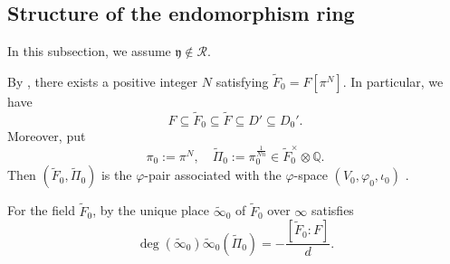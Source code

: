 \documentclass[10pt]{amsart}
\theoremstyle{plain}
\theoremstyle{definition}
\newcommand{\cR}{\mathcal{R}}
\newcommand{\bQ}{\mathbb{Q}}
\newcommand{\fry}{\mathfrak{y}}
\begin{document}
\subsection{Structure of the endomorphism ring}\label{SubsecStrEndRing}

In this subsection, we assume $\fry\notin\cR$.



By \cite[(A.4) and Corollary 9.10]{LRS},
there exists a positive integer $N$ satisfying $\tilde{F}_0=F[\pi^N]$.
In particular, we have
\begin{equation}\label{EqnEmbFtilde0D0Prime}
F\subseteq \tilde{F}_0\subseteq \tilde{F}\subseteq D'\subseteq D_0'.
\end{equation}
Moreover, put
\[
\pi_0:=\pi^N,\quad \tilde{\Pi}_0:=\pi_0^{\frac{1}{Nn}}\in \tilde{F}_0^\times\otimes \bQ. 
\]
Then $(\tilde{F}_0,\tilde{\Pi}_0)$ is the $\varphi$-pair associated with the $\varphi$-space $(V_0,\varphi_0,\iota_0)$
\cite[(A.4)]{LRS}.


For the field $\tilde{F}_0$, by \cite[Proposition 9.9 (ii)]{LRS} the unique place $\tilde{\infty}_0$ of $\tilde{F}_0$
over $\infty$ satisfies
\begin{equation}\label{EqnUniquePlaceInfty_LRS}
	\deg(\tilde{\infty}_0)\tilde{\infty}_0(\tilde{\Pi}_0)=-\frac{[\tilde{F}_0:F]}{d}.
\end{equation}
\end{document}

